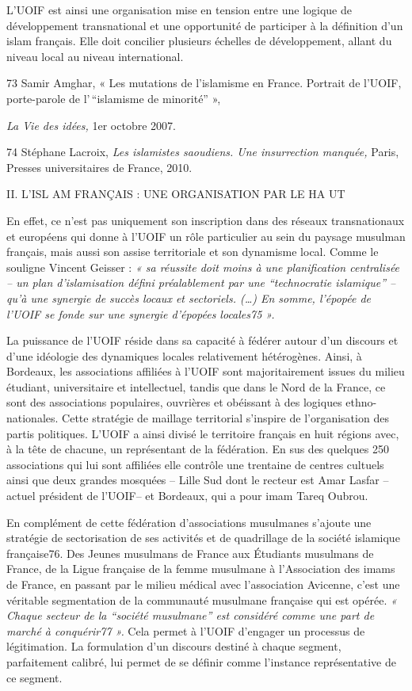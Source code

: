 L'UOIF est ainsi une organisation mise en tension entre une logique de
développement transnational et une opportunité de participer à la
définition d'un islam français. Elle doit concilier plusieurs échelles
de développement, allant du niveau local au niveau international.

73 Samir Amghar, « Les mutations de l'islamisme en France. Portrait de
l'UOIF, porte-parole de l'\,``islamisme de minorité'' »,

\emph{La Vie des idées,} 1er octobre 2007.

74 Stéphane Lacroix, \emph{Les islamistes saoudiens. Une insurrection
manquée,} Paris, Presses universitaires de France, 2010.

II. L'ISL AM FRANÇAIS : UNE ORGANISATION PAR LE HA UT

En effet, ce n'est pas uniquement son inscription dans des réseaux
transnationaux et européens qui donne à l'UOIF un rôle particulier au
sein du paysage musulman français, mais aussi son assise territoriale et
son dynamisme local. Comme le souligne Vincent Geisser : \emph{« sa
réussite doit moins à une planification centralisée -- un plan
d'islamisation défini préalablement par une ``technocratie islamique''
-- qu'à une synergie de succès locaux et sectoriels. (\ldots) En somme,
l'épopée de l'UOIF se fonde sur une synergie d'épopées locales75 ».}

La puissance de l'UOIF réside dans sa capacité à fédérer autour d'un
discours et d'une idéologie des dynamiques locales relativement
hétérogènes. Ainsi, à Bordeaux, les associations affiliées à l'UOIF sont
majoritairement issues du milieu étudiant, universitaire et
intellectuel, tandis que dans le Nord de la France, ce sont des
associations populaires, ouvrières et obéissant à des logiques
ethno-nationales. Cette stratégie de maillage territorial s'inspire de
l'organisation des partis politiques. L'UOIF a ainsi divisé le
territoire français en huit régions avec, à la tête de chacune, un
représentant de la fédération. En sus des quelques 250 associations qui
lui sont affiliées elle contrôle une trentaine de centres cultuels ainsi
que deux grandes mosquées -- Lille Sud dont le recteur est Amar Lasfar
-- actuel président de l'UOIF-- et Bordeaux, qui a pour imam Tareq
Oubrou.

En complément de cette fédération d'associations musulmanes s'ajoute une
stratégie de sectorisation de ses activités et de quadrillage de la
société islamique française76. Des Jeunes musulmans de France aux
Étudiants musulmans de France, de la Ligue française de la femme
musulmane à l'Association des imams de France, en passant par le milieu
médical avec l'association Avicenne, c'est une véritable segmentation de
la communauté musulmane française qui est opérée. \emph{« Chaque secteur
de la ``société musulmane'' est considéré comme une part de marché à
conquérir77 ».} Cela permet à l'UOIF d'engager un processus de
légitimation. La formulation d'un discours destiné à chaque segment,
parfaitement calibré, lui permet de se définir comme l'instance
représentative de ce segment.

